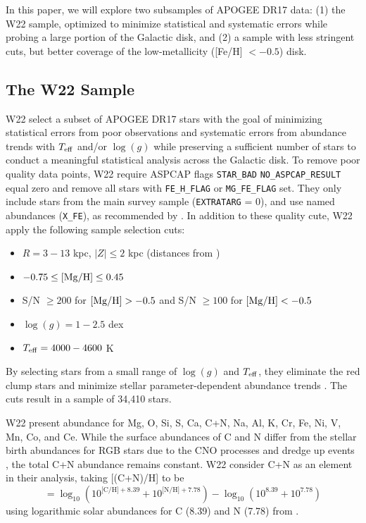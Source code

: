 \documentclass[modern]{aastex631}
\newcommand{\mgh}{[{\rm Mg}/{\rm H}]}
\newcommand{\logg}{\log(g)}
\newcommand{\teff}{T_{\rm eff}}
\begin{document}
In this paper, we will explore two subsamples of APOGEE DR17 data: (1) the W22 sample, optimized to minimize statistical and systematic errors while probing a large portion of the Galactic disk, and (2) a sample with less stringent cuts, but better coverage of the low-metallicity ([Fe/H] $< -0.5$) disk.

\subsection{The W22 Sample}

W22 select a subset of APOGEE DR17 stars with the goal of minimizing statistical errors from poor observations and systematic errors from abundance trends with $\teff$ and/or $\logg$ while preserving a sufficient number of stars to conduct a meaningful statistical analysis across the Galactic disk. To remove poor quality data points, W22 require ASPCAP flags \texttt{STAR\_BAD} \texttt{NO\_ASPCAP\_RESULT} equal zero and remove all stars with \texttt{FE\_H\_FLAG} or \texttt{MG\_FE\_FLAG} set. They only include stars from the main survey sample (\texttt{EXTRATARG} = 0), and use named abundances (\texttt{X\_FE}), as recommended by \citet{jonsson2020}. In addition to these quality cute, W22 apply the following sample selection cuts:
\begin{itemize}
\itemsep0em
    \item $R=3-13$ kpc, $|Z| \leq 2$ kpc (distances from \citet{leung2019})
    \item $-0.75 \leq \mgh \leq 0.45$
    \item S/N $\geq 200$ for $\mgh > -0.5$ and S/N $\geq 100$ for $\mgh < -0.5$
    \item $\logg = 1-2.5$ dex
    \item $\teff = 4000-4600$ K
\end{itemize}
By selecting stars from a small range of $\logg$ and $\teff$, they eliminate the red clump stars and minimize stellar parameter-dependent abundance trends \citep[see][]{griffith2021a}. The cuts result in a sample of 34,410 stars. 

W22 present abundance for Mg, O, Si, S, Ca, C+N, Na, Al, K, Cr, Fe, Ni, V, Mn, Co, and Ce. While the surface abundances of C and N differ from the stellar birth abundances for RGB stars due to the CNO processes and dredge up events \citep{iben1965, shetrone2019}, the total C+N abundance remains constant. W22 consider C+N as an element in their analysis, taking [(C+N)/H] to be 
\begin{equation}
    [\text{C+N}/\text{H}] = \log_{10}(10^{\text{[C/H]}+8.39} + 10^{\text{[N/H]}+7.78}) - \log_{10}(10^{8.39} + 10^{7.78})
\end{equation}
using logarithmic solar abundances for C (8.39) and N (7.78) from \citet{grevesse2007}.
\end{document}
